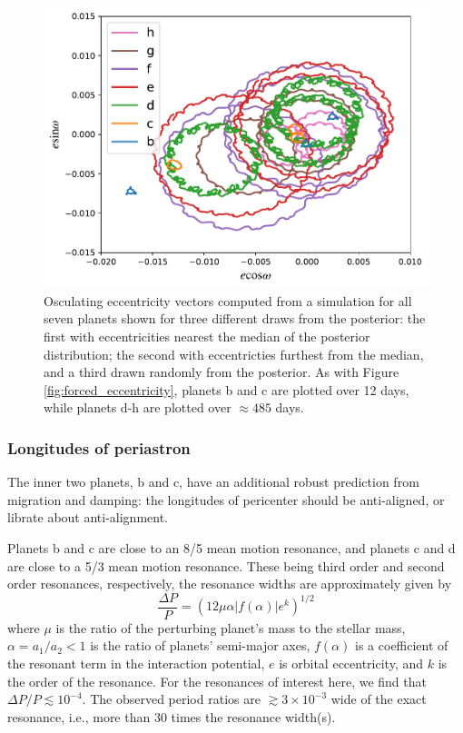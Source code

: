 \documentclass[fleqn,usenatbib]{mnras} %
\begin{document}
\begin{figure}
    \centering
    \includegraphics[width=\hsize]{figures/T1_evector.pdf}
    \caption{Osculating eccentricity vectors computed from a simulation for all seven planets shown for three different draws from
    the posterior:  the first with eccentricities nearest the median of the posterior distribution;
    the second with eccentricties furthest from the median, and a third drawn randomly from
    the posterior.  As with Figure \ref{fig:forced_eccentricity}, planets b and c are plotted
    over 12 days, while planets d-h are plotted over $\approx 485$ days.}
    \label{fig:total_eccentricity}
\end{figure}

\subsubsection{Longitudes of periastron}

The inner two planets, b and c, have an additional robust prediction from 
migration and damping:
the longitudes of pericenter should be anti-aligned, or librate about
anti-alignment. %

Planets b and c are close to an 8/5 mean motion resonance, and planets c and d are close to a 5/3 mean motion resonance. These being third order and second order resonances, respectively, the resonance widths are approximately given by~\citep{Murray1999}
\begin{equation}
\frac{\Delta P}{P} = (12\mu\alpha |f(\alpha)| e^k)^{1/2}
\label{e:reswidth}\end{equation}
where $\mu$ is the ratio of the perturbing planet's mass to the stellar mass, $\alpha{=}a_1/a_2{<}1$ is the ratio of planets' semi-major axes, $f(\alpha)$ is a coefficient of the resonant term in the interaction potential, $e$ is orbital eccentricity, and $k$ is the order of the resonance.  For the resonances of interest here, we find that $\Delta P/P\lesssim10^{-4}$. The observed period ratios are $\gtrsim3\times10^{-3}$ wide of the exact resonance, i.e., more than 30 times the resonance width(s).
\end{document}
